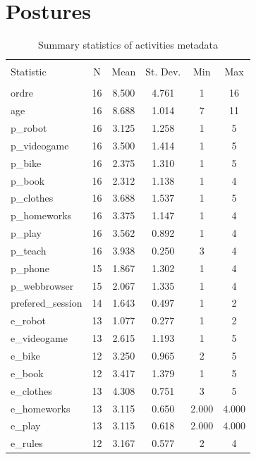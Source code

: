\documentclass{article}
\begin{document}
\section{Postures}
\begin{table}[!htbp] \centering 
  \caption{Summary statistics of activities metadata} 
  \label{} 
\begin{tabular}{@{\extracolsep{5pt}}lccccc} 
\\[-1.8ex]\hline 
\hline \\[-1.8ex] 
Statistic & \multicolumn{1}{c}{N} & \multicolumn{1}{c}{Mean} & \multicolumn{1}{c}{St. Dev.} & \multicolumn{1}{c}{Min} & \multicolumn{1}{c}{Max} \\ 
\hline \\[-1.8ex] 
ordre & 16 & 8.500 & 4.761 & 1 & 16 \\ 
age & 16 & 8.688 & 1.014 & 7 & 11 \\ 
p\_robot & 16 & 3.125 & 1.258 & 1 & 5 \\ 
p\_videogame & 16 & 3.500 & 1.414 & 1 & 5 \\ 
p\_bike & 16 & 2.375 & 1.310 & 1 & 5 \\ 
p\_book & 16 & 2.312 & 1.138 & 1 & 4 \\ 
p\_clothes & 16 & 3.688 & 1.537 & 1 & 5 \\ 
p\_homeworks & 16 & 3.375 & 1.147 & 1 & 4 \\ 
p\_play & 16 & 3.562 & 0.892 & 1 & 4 \\ 
p\_teach & 16 & 3.938 & 0.250 & 3 & 4 \\ 
p\_phone & 15 & 1.867 & 1.302 & 1 & 4 \\ 
p\_webbrowser & 15 & 2.067 & 1.335 & 1 & 4 \\ 
prefered\_session & 14 & 1.643 & 0.497 & 1 & 2 \\ 
e\_robot & 13 & 1.077 & 0.277 & 1 & 2 \\ 
e\_videogame & 13 & 2.615 & 1.193 & 1 & 5 \\ 
e\_bike & 12 & 3.250 & 0.965 & 2 & 5 \\ 
e\_book & 12 & 3.417 & 1.379 & 1 & 5 \\ 
e\_clothes & 13 & 4.308 & 0.751 & 3 & 5 \\ 
e\_homeworks & 13 & 3.115 & 0.650 & 2.000 & 4.000 \\ 
e\_play & 13 & 3.115 & 0.618 & 2.000 & 4.000 \\ 
e\_rules & 12 & 3.167 & 0.577 & 2 & 4 \\ 

\end{tabular}
\end{table}
\end{document}
